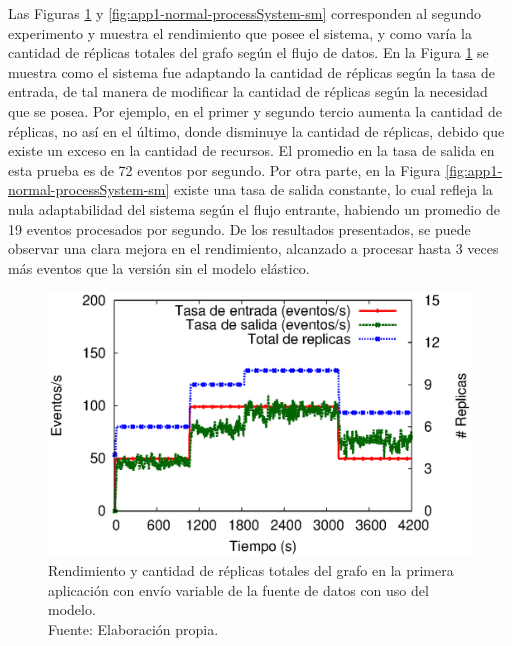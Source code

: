 Las Figuras \ref{fig:app1-normal-processSystem-cm} y \ref{fig:app1-normal-processSystem-sm} \normalsize{corresponden al segundo experimento y muestra el rendimiento que posee el sistema, y como varía la cantidad de réplicas totales del grafo según el flujo de datos.} En la Figura \ref{fig:app1-normal-processSystem-cm} \normalsize{se muestra como el sistema fue adaptando la cantidad de réplicas según la tasa de entrada, de tal manera de modificar la cantidad de réplicas según la necesidad que se posea. Por ejemplo, en el primer y segundo tercio aumenta la cantidad de réplicas, no así en el último, donde disminuye la cantidad de réplicas, debido que existe un exceso en la cantidad de recursos. El promedio en la tasa de salida en esta prueba es de 72 eventos por segundo.} Por otra parte, en la Figura \ref{fig:app1-normal-processSystem-sm} \normalsize{existe una tasa de salida constante, lo cual refleja la nula adaptabilidad del sistema según el flujo entrante, habiendo un promedio de 19 eventos procesados por segundo. De los resultados presentados, se puede observar una clara mejora en el rendimiento, alcanzado a procesar hasta 3 veces más eventos que la versión sin el modelo elástico.}

\begin{figure}[!ht]
	\centering
	\captionsetup{justification=centering}
	\includegraphics[scale=0.7]{images/exp/app1/normal/cm/processSystem.eps}
    \caption[Rendimiento y cantidad de réplicas totales del grafo en la primera aplicación con envío variable de la fuente de datos con uso del modelo.]{Rendimiento y cantidad de réplicas totales del grafo en la primera aplicación con envío variable de la fuente de datos con uso del modelo.\\Fuente: Elaboración propia.}
	\label{fig:app1-normal-processSystem-cm}
\end{figure}

